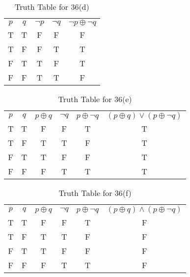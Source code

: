\documentclass{Axon}
\begin{document}
\begin{table}[ht]
    \centering
    \begin{tabular}{c|c|c|c|c}
        \(p\) & \(q\) & \(\lnot p\) & \(\lnot q\) & \(\lnot p \oplus \lnot q\) \\
        T     & T     & F           & F           & F                          \\
        T     & F     & F           & T           & T                          \\
        F     & T     & T           & F           & T                          \\
        F     & F     & T           & T           & F
    \end{tabular}
    \caption{Truth Table for 36(d)}
\end{table}

\begin{table}[ht]
    \centering
    \begin{tabular}{c|c|c|c|c|c}
        \(p\) & \(q\) & \(p \oplus q\) & \(\lnot q\) & \(p \oplus \lnot q\) & \((p \oplus q) \lor (p \oplus \lnot q)\) \\
        T     & T     & F              & F           & T                    & T                                        \\
        T     & F     & T              & T           & F                    & T                                        \\
        F     & T     & T              & F           & F                    & T                                        \\
        F     & F     & F              & T           & T                    & T
    \end{tabular}
    \caption{Truth Table for 36(e)}
\end{table}

\begin{table}[ht]
    \centering
    \begin{tabular}{c|c|c|c|c|c}
        \(p\) & \(q\) & \(p \oplus q\) & \(\lnot q\) & \(p \oplus \lnot q\) & \((p \oplus q) \land (p \oplus \lnot q)\) \\
        T     & T     & F              & F           & T                    & F                                         \\
        T     & F     & T              & T           & F                    & F                                         \\
        F     & T     & T              & F           & F                    & F                                         \\
        F     & F     & F              & T           & T                    & F 
    \end{tabular}
    \caption{Truth Table for 36(f)}
\end{table}
\end{document}

